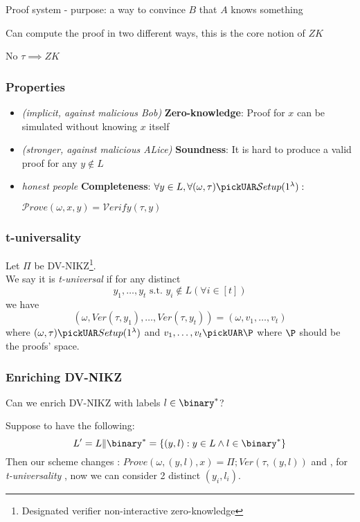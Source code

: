 Proof system - purpose: a way to convince $B$ that $A$ knows something

Can compute the proof in two different ways, this is the core notion of $ZK$

No $\tau \implies ZK$

\subsubsection{Properties}

\begin{itemize}
    \item \textit{(implicit, against malicious Bob)} \textbf{Zero-knowledge}: Proof for $x$ can be simulated without knowing $x$ itself
    \item \textit{(stronger, against malicious ALice)} \textbf{Soundness}: It is hard to produce a valid proof for any $y \notin L$
    \item \textit{honest people} \textbf{Completeness}: $\forall y \in L, \forall (\omega, \tau) \pickUAR \mathcal{S}etup(1^\lambda):$
    
    $\mathcal{P}rove(\omega, x, y) = \mathcal{V}erify(\tau, y)$
\end{itemize}


\subsubsection{t-universality}
\begin{definition}
    Let $\Pi$ be DV-NIKZ\footnote{Designated verifier non-interactive
    zero-knowledge}.\\
We say it is \textit{t-universal} if for any distinct 
\[
    y_{1}, \ldots, y_{t} \text{ s.t. } y_{i}\not\in L ( \forall i \in [t])
\]
we have 
\[
    ( \omega, Ver(\tau, y_{1}), \ldots, Ver(\tau, y_{t}))=(\omega, v_{1},
    \ldots, v_{t})
\]
where $(\omega, \tau) \pickUAR Setup(1^{\lambda})$ and $v_{1}, \ldots, v_{t}
\pickUAR \P$ where $\P$ should be the proofs' space.
\end{definition}

\subsubsection{Enriching DV-NIKZ}
Can we enrich DV-NIKZ with labels $l \in \binary^{*}$?

Suppose to have the following:
\[
    L'=L \| \binary^{*}=\{(y,l): y \in L \wedge l \in \binary^{*}\}
\]
Then our scheme changes :
$Prove(\omega, (y,l), x)=\Pi; Ver(\tau, (y, l)) $
and , for \textit{t-universality} , now we can consider 2 distinct $(y_{i},
l_{i})$.
